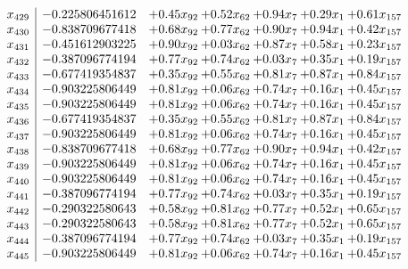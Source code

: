 \documentclass[8pt]{article}
\begin{document}
\[\begin{array}{c| c c@{\hskip 2pt} c@{\hskip 2pt} c@{\hskip 2pt} c@{\hskip 2pt} c@{\hskip 2pt} }
 x_{429}   &  -0.225806451612 & +  0.45 x_{92} & +  0.52 x_{62} & +  0.94 x_{7} & +  0.29 x_{1} & +  0.61 x_{157}\\
 x_{430}   &  -0.838709677418 & +  0.68 x_{92} & +  0.77 x_{62} & +  0.90 x_{7} & +  0.94 x_{1} & +  0.42 x_{157}\\
 x_{431}   &  -0.451612903225 & +  0.90 x_{92} & +  0.03 x_{62} & +  0.87 x_{7} & +  0.58 x_{1} & +  0.23 x_{157}\\
 x_{432}   &  -0.387096774194 & +  0.77 x_{92} & +  0.74 x_{62} & +  0.03 x_{7} & +  0.35 x_{1} & +  0.19 x_{157}\\
 x_{433}   &  -0.677419354837 & +  0.35 x_{92} & +  0.55 x_{62} & +  0.81 x_{7} & +  0.87 x_{1} & +  0.84 x_{157}\\
 x_{434}   &  -0.903225806449 & +  0.81 x_{92} & +  0.06 x_{62} & +  0.74 x_{7} & +  0.16 x_{1} & +  0.45 x_{157}\\
 x_{435}   &  -0.903225806449 & +  0.81 x_{92} & +  0.06 x_{62} & +  0.74 x_{7} & +  0.16 x_{1} & +  0.45 x_{157}\\
 x_{436}   &  -0.677419354837 & +  0.35 x_{92} & +  0.55 x_{62} & +  0.81 x_{7} & +  0.87 x_{1} & +  0.84 x_{157}\\
 x_{437}   &  -0.903225806449 & +  0.81 x_{92} & +  0.06 x_{62} & +  0.74 x_{7} & +  0.16 x_{1} & +  0.45 x_{157}\\
 x_{438}   &  -0.838709677418 & +  0.68 x_{92} & +  0.77 x_{62} & +  0.90 x_{7} & +  0.94 x_{1} & +  0.42 x_{157}\\
 x_{439}   &  -0.903225806449 & +  0.81 x_{92} & +  0.06 x_{62} & +  0.74 x_{7} & +  0.16 x_{1} & +  0.45 x_{157}\\
 x_{440}   &  -0.903225806449 & +  0.81 x_{92} & +  0.06 x_{62} & +  0.74 x_{7} & +  0.16 x_{1} & +  0.45 x_{157}\\
 x_{441}   &  -0.387096774194 & +  0.77 x_{92} & +  0.74 x_{62} & +  0.03 x_{7} & +  0.35 x_{1} & +  0.19 x_{157}\\
 x_{442}   &  -0.290322580643 & +  0.58 x_{92} & +  0.81 x_{62} & +  0.77 x_{7} & +  0.52 x_{1} & +  0.65 x_{157}\\
 x_{443}   &  -0.290322580643 & +  0.58 x_{92} & +  0.81 x_{62} & +  0.77 x_{7} & +  0.52 x_{1} & +  0.65 x_{157}\\
 x_{444}   &  -0.387096774194 & +  0.77 x_{92} & +  0.74 x_{62} & +  0.03 x_{7} & +  0.35 x_{1} & +  0.19 x_{157}\\
 x_{445}   &  -0.903225806449 & +  0.81 x_{92} & +  0.06 x_{62} & +  0.74 x_{7} & +  0.16 x_{1} & +  0.45 x_{157}\\

\end{array}\]
\end{document}
